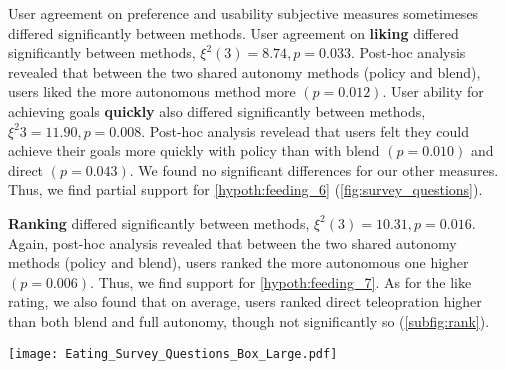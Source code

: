 User agreement on preference and usability subjective measures sometimeses differed significantly between methods. User agreement on \textbf{liking} differed significantly between methods, $\xi^2(3) = 8.74, p=0.033$. Post-hoc analysis revealed that between the two shared autonomy methods (policy and blend), users liked the more autonomous method more $(p=0.012)$. User ability for achieving goals \textbf{quickly} also differed significantly between methods, $\xi^2{3} = 11.90, p=0.008$. Post-hoc analysis revelead that users felt they could achieve their goals more quickly with policy than with blend $(p=0.010)$ and direct $(p=0.043)$. We found no significant differences for our other measures. Thus, we find partial support for \cref{hypoth:feeding_6} (\cref{fig:survey_questions}).

\textbf{Ranking} differed significantly between methods, $\xi^2(3) = 10.31, p=0.016$. Again, post-hoc analysis revealed that between the two shared autonomy methods (policy and blend), users ranked the more autonomous one higher $(p=0.006)$. Thus, we find support for \cref{hypoth:feeding_7}. As for the like rating, we also found that on average, users ranked direct teleopration higher than both blend and full autonomy, though not significantly so (\cref{subfig:rank}).




\begin{figure*}[t]
  \texttt{[image: Eating\_Survey\_Questions\_Box\_Large.pdf]}
  \caption{Boxplots for user responses to all survey question. See \cref{sec:experiment_hri_2016_procedure} for specific questions. Pairs that were found significant during post-analysis are plotted, where ${*}$ indicates $p<0.05$, ${*}{*}$ that $p<0.01$, and ${*}{*}{*}$ that $p<0.001$. We note that policy was perceived as quick, even though autonomy actually had lower task completion (\cref{subfig:time}). Additionally, autonomy had a very high variance in user responses for many questions, with users very mixed on if it did what they wanted, and achieved their goal. On average, we see that policy did better then other methods for most user responses.}
  \label{fig:survey_questions}
\end{figure*}







